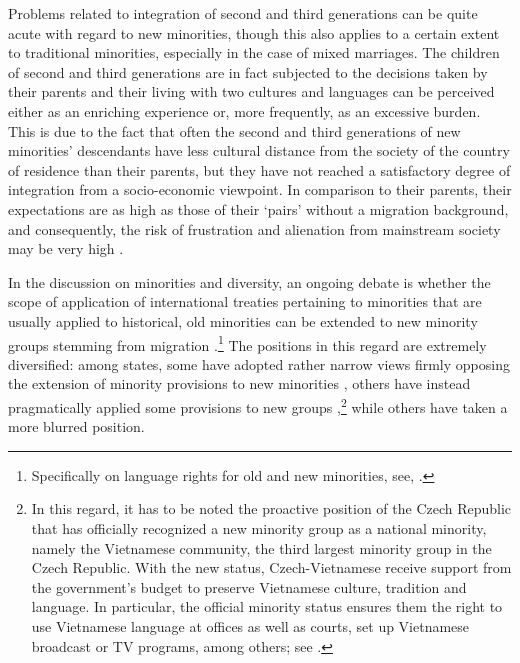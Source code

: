 \documentclass[output=paper,colorlinks,citecolor=brown]{langscibook}
\begin{document}
Problems related to integration of second and third generations can be quite acute with regard to new minorities, though this also applies to a certain extent to traditional minorities, especially in the case of mixed marriages. The children of second and third generations are in fact subjected to the decisions taken by their parents and their living with two cultures and languages can be perceived either as an enriching experience or, more frequently, as an excessive burden. This is due to the fact that often the second and third generations of new minorities' descendants have less cultural distance from the society of the country of residence than their parents, but they have not reached a satisfactory degree of integration from a socio-economic viewpoint. In comparison to their parents, their expectations are as high as those of their `pairs' without a migration background, and consequently, the risk of frustration and alienation from mainstream society may be very high \citep{alba_holdaway2013,wihtol_de_wenden2015}.

In the discussion on minorities and diversity, an ongoing debate is whether the scope of application of international treaties pertaining to minorities that are usually applied to historical, old minorities can be extended to new minority groups stemming from migration \citep{hofmann2006_impact_of_international_norms,kymlicka2007,medda-windischer2017,medda-windischer2009,joppke2010,jackson_preece2010}.\footnote{Specifically on language rights for old and new minorities, see, \citet{poggeschi2013}.} The positions in this regard are extremely diversified: among states, some have adopted rather narrow views firmly opposing the extension of minority provisions to new minorities \citep{coe1995,coe1997}, others have instead pragmatically applied some provisions to new groups \citep{acfc2001b,acfc2004},\footnote{In this regard, it has to be noted the proactive position of the Czech Republic that has officially recognized a new minority group as a national minority, namely the Vietnamese community, the third largest minority group in the Czech Republic. With the new status, Czech-Vietnamese receive support from the government's budget to preserve Vietnamese culture, tradition and language. In particular, the official minority status ensures them the right to use Vietnamese language at offices as well as courts, set up Vietnamese broadcast or TV programs, among others; see \citet{kascian_vasilevich2013,trlifajova2013}.} while others have taken a more blurred position. 
\end{document}
